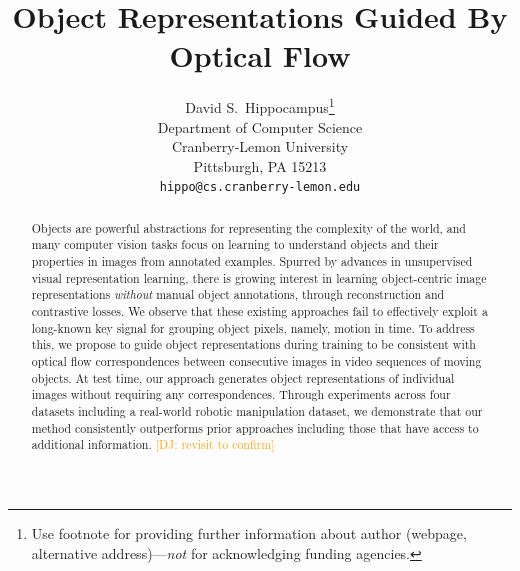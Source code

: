 \documentclass{article}
\title{Object Representations Guided By Optical Flow}
\author{%
  David S.~Hippocampus\thanks{Use footnote for providing further information
    about author (webpage, alternative address)---\emph{not} for acknowledging
    funding agencies.} \\
  Department of Computer Science\\
  Cranberry-Lemon University\\
  Pittsburgh, PA 15213 \\
  \texttt{hippo@cs.cranberry-lemon.edu} \\
}
\newcommand{\jd}[1]{\textcolor{orange}{[DJ: #1]}}
\begin{document}
\maketitle

  
  

\begin{abstract}
  Objects are powerful abstractions for representing the complexity of the world, and many computer vision tasks focus on learning to understand objects and their properties in images from annotated examples. Spurred by advances in unsupervised visual representation learning,  there is growing interest in learning object-centric image representations \emph{without} manual object annotations, through reconstruction and contrastive losses. We observe that these existing approaches fail to effectively exploit a long-known key signal for grouping object pixels, namely, motion in time. To address this, we propose to guide object representations during training to be consistent with optical flow correspondences between consecutive images in video sequences of moving objects. At test time, our approach generates object representations of individual images without requiring any correspondences. Through experiments across four datasets including a real-world robotic manipulation dataset, we demonstrate that our method consistently outperforms prior approaches including those that have access to additional information. \jd{revisit to confirm}
 \end{abstract}
\end{document}
